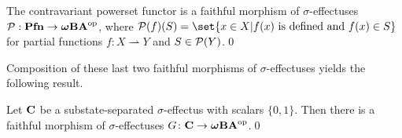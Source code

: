 \documentclass[%
	submission,
copyright,creativecommons,UKenglish]{eptcs}
\begin{document}


\begin{proposition}\label{prop:powerset-functor}
  The contravariant powerset functor is a faithful morphism of $\sigma$-effectuses $\mathcal{P}:\mathbf{Pfn}\rightarrow \boldsymbol{\omega}\mathbf{BA}^{\mathrm{op}}$,
where
$\Pow(f)(S)= \set{x\in X | f(x)
\text{ is defined and } f(x)\in S}$
for partial functions $f\colon X\rightharpoonup Y$
and $S\in \mathcal{P}(Y)$.\qed
\end{proposition}

Composition of these last two faithful morphisms of $\sigma$-effectuses
yields the following result.

\begin{theorem}
    Let $\mathbf{C}$ be a substate-separated $\sigma$-effectus with scalars $\{0,1\}$.
    Then there is a faithful morphism of $\sigma$-effectuses $G\colon\mathbf{C}\rightarrow \boldsymbol{\omega}\mathbf{BA}^{\mathrm{op}}$.\qed
\end{theorem}
\end{document}
